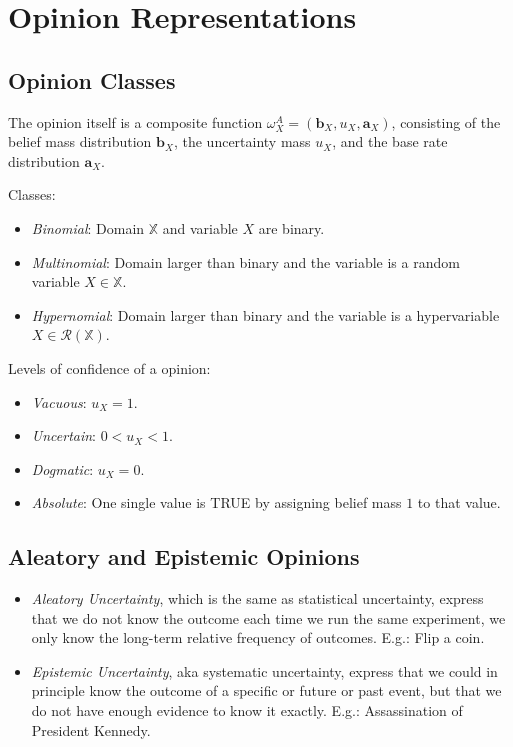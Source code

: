 
\section{Opinion Representations}

\subsection{Opinion Classes}

The opinion itself is a composite function $\omega^A_ X = \left(\mathbf{b}_X, u_X, \mathbf{a}_X\right)$, consisting of the belief mass distribution $\mathbf{b}_X$, the uncertainty mass $u_X$, and the base rate distribution $\mathbf{a}_X$.

Classes:
\begin{itemize}
	\item \emph{Binomial}: Domain $\mathbb{X}$ and variable $X$ are binary.
	\item \emph{Multinomial}: Domain larger than binary and the variable is a random variable $X \in \mathbb{X}$.
	\item \emph{Hypernomial}: Domain larger than binary and the variable is a hypervariable $X \in \mathcal{R}(\mathbb{X})$.
\end{itemize}

Levels of confidence of a opinion:
\begin{itemize}
	\item \emph{Vacuous}: $u_X = 1$.
	\item \emph{Uncertain}: $0 < u_X < 1$.
	\item \emph{Dogmatic}: $u_X = 0$.
	\item \emph{Absolute}: One single value is TRUE by assigning belief mass $1$ to that value.
\end{itemize}

\subsection{Aleatory and Epistemic Opinions}

\begin{itemize}
	\item \emph{Aleatory Uncertainty}, which is the same as statistical uncertainty, express that we do not know the outcome each time we run the same experiment, we only know the long-term relative frequency of outcomes. E.g.: Flip a coin.
	\item \emph{Epistemic Uncertainty}, aka systematic uncertainty, express that we could in principle know the outcome of a specific or future or past event, but that we do not have enough evidence to know it exactly. E.g.: Assassination of President Kennedy.
\end{itemize}

